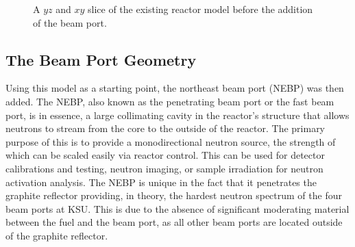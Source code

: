 \begin{figure}
\centering
{} 
\caption[Old Reactor Model]{A $yz$ and $xy$ slice of the existing reactor model before the addition of the beam port.}
\label{fig:existing}
\end{figure}


\subsection{The Beam Port Geometry}

Using this model as a starting point, the northeast beam port (NEBP) was then added.
The NEBP, also known as the penetrating beam port or the fast beam port, is in essence, a large collimating cavity in the reactor's structure that allows neutrons to stream from the core to the outside of the reactor.
The primary purpose of this is to provide a monodirectional neutron source, the strength of which can be scaled easily via reactor control.
This can be used for detector calibrations and testing, neutron imaging, or sample irradiation for neutron activation analysis.
The NEBP is unique in the fact that it penetrates the graphite reflector providing, in theory, the hardest neutron spectrum of the four beam ports at KSU.
This is due to the absence of significant moderating material between the fuel and the beam port, as all other beam ports are located outside of the graphite reflector.

